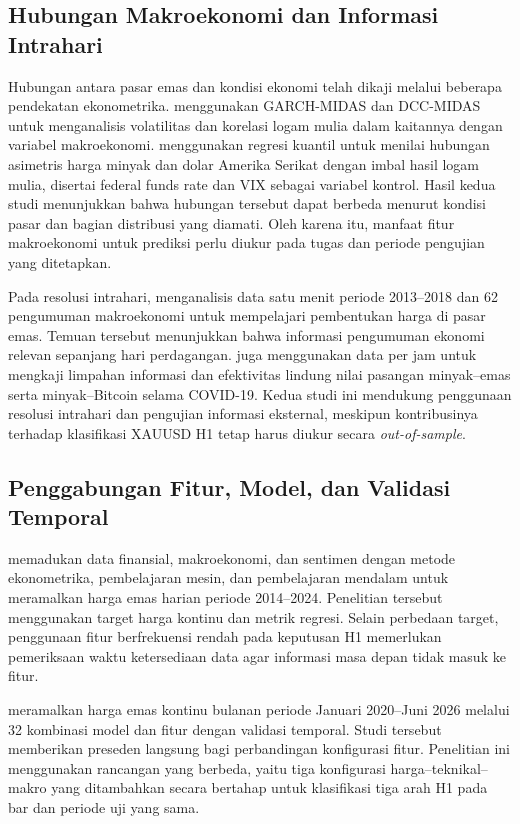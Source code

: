 \subsection{Hubungan Makroekonomi dan Informasi Intrahari}

Hubungan antara pasar emas dan kondisi ekonomi telah dikaji melalui beberapa pendekatan ekonometrika. \textcite{dinh2022economic} menggunakan GARCH-MIDAS dan DCC-MIDAS untuk menganalisis volatilitas dan korelasi logam mulia dalam kaitannya dengan variabel makroekonomi. \textcite{wang2023asymmetric} menggunakan regresi kuantil untuk menilai hubungan asimetris harga minyak dan dolar Amerika Serikat dengan imbal hasil logam mulia, disertai federal funds rate dan VIX sebagai variabel kontrol. Hasil kedua studi menunjukkan bahwa hubungan tersebut dapat berbeda menurut kondisi pasar dan bagian distribusi yang diamati. Oleh karena itu, manfaat fitur makroekonomi untuk prediksi perlu diukur pada tugas dan periode pengujian yang ditetapkan.

Pada resolusi intrahari, \textcite{sobti2021how} menganalisis data satu menit periode 2013--2018 dan 62 pengumuman makroekonomi untuk mempelajari pembentukan harga di pasar emas. Temuan tersebut menunjukkan bahwa informasi pengumuman ekonomi relevan sepanjang hari perdagangan. \textcite{yousaf2022information} juga menggunakan data per jam untuk mengkaji limpahan informasi dan efektivitas lindung nilai pasangan minyak--emas serta minyak--Bitcoin selama COVID-19. Kedua studi ini mendukung penggunaan resolusi intrahari dan pengujian informasi eksternal, meskipun kontribusinya terhadap klasifikasi XAUUSD H1 tetap harus diukur secara \emph{out-of-sample}.

\subsection{Penggabungan Fitur, Model, dan Validasi Temporal}

\textcite{taneva2025framework} memadukan data finansial, makroekonomi, dan sentimen dengan metode ekonometrika, pembelajaran mesin, dan pembelajaran mendalam untuk meramalkan harga emas harian periode 2014--2024. Penelitian tersebut menggunakan target harga kontinu dan metrik regresi. Selain perbedaan target, penggunaan fitur berfrekuensi rendah pada keputusan H1 memerlukan pemeriksaan waktu ketersediaan data agar informasi masa depan tidak masuk ke fitur.

\textcite{velez2026predictive} meramalkan harga emas kontinu bulanan periode Januari 2020--Juni 2026 melalui 32 kombinasi model dan fitur dengan validasi temporal. Studi tersebut memberikan preseden langsung bagi perbandingan konfigurasi fitur. Penelitian ini menggunakan rancangan yang berbeda, yaitu tiga konfigurasi harga--teknikal--makro yang ditambahkan secara bertahap untuk klasifikasi tiga arah H1 pada bar dan periode uji yang sama.

